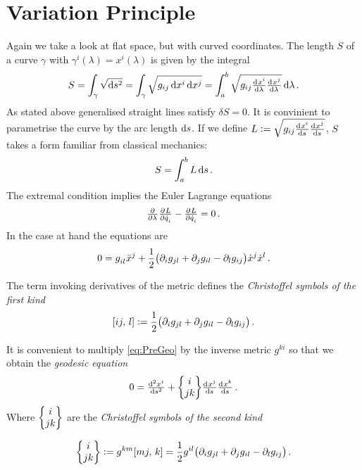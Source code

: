 \section{Variation Principle}
Again we take a look at flat space, but with curved coordinates. 
The length $S$ of a curve $\gamma$ with $\gamma^i(\lambda) = x^i(\lambda)$ is
given by the integral
\begin{equation}
    S=\int_{\gamma}\sqrt{\dif s^2} = 
    \int_{\gamma}\sqrt{g_{ij}\dif x^i\dif x^j}=\int_{a}^{b}\sqrt{g_{ij}\od{x^i}{\lambda} \od{x^j}{\lambda}}\dif \lambda\, .
\end{equation}
As stated above generalised straight lines satisfy $\delta S = 0$. It is
convinient to parametrise the curve by the arc length $\dif s$. If we define
$L:=\sqrt{g_{ij}\od{x^i}{s} \od{x^j}{s}}$, $S$ takes a form
familiar from classical mechanics:
\begin{equation}
    S=\int_a^b L\dif s\, .
\end{equation}
The extremal condition implies the Euler Lagrange equations
\begin{equation}
    \pd{}{\lambda}\pd{L}{\dot{q}_i}-\pd{L}{\dot{q}_i}
=0\, .		\end{equation}
In the case at hand the equations are
\begin{equation}
    0=\tensor{g}{_i_l}\tensor{\ddot{x}}{^j}+\frac{1}{2} \left(\partial_i g_{jl} + \partial_j g_{il} - 
    \partial_l g_{ij}\right)\dot{x}^j\dot{x}^l\, . \label{eq:PreGeo}
\end{equation}
\begin{definition}
The term invoking derivatives of the metric defines the \emph{Christoffel
symbols of the first kind}
\begin{equation}
    \csym{i}{j}{l}:=\frac{1}{2} \left(\partial_i g_{jl} + \partial_j g_{il} -
    \partial_l g_{ij}\right)\, .
\end{equation}
\end{definition}
It is convenient to multiply \eqref{eq:PreGeo} by the inverse metric $g^{ki}$ so that we obtain the \emph{geodesic equation}
\begin{equation}
    0 = \od[2]{x^i}{s}+\cSym{i}{j}{k}\od{x^j}{s}\od{x^k}{s}\, .
\end{equation}
Where $\begin{Bmatrix} i \\ j k \end{Bmatrix}$ are the \emph{Christoffel symbols of the second kind}
\begin{definition}
\begin{equation}
   \cSym{i}{j}{k}:=g^{km}\csym{m}{j}{k}=\frac{1}{2}g^{il}\left(\partial_i
    g_{jl} + \partial_j g_{il} - \partial_l g_{ij}\right)\, .
\end{equation}
\end{definition}
